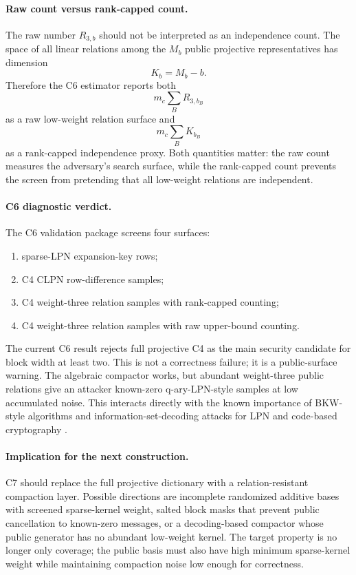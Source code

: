 \paragraph{Raw count versus rank-capped count.}
The raw number $R_{3,b}$ should not be interpreted as an independence count.
The space of all linear relations among the $M_b$ public projective
representatives has dimension
\[
    K_b = M_b-b.
\]
Therefore the C6 estimator reports both
\[
    m_c \sum_B R_{3,b_B}
\]
as a raw low-weight relation surface and
\[
    m_c \sum_B K_{b_B}
\]
as a rank-capped independence proxy.  Both quantities matter: the raw count
measures the adversary's search surface, while the rank-capped count prevents
the screen from pretending that all low-weight relations are independent.

\paragraph{C6 diagnostic verdict.}
The C6 validation package screens four surfaces:
\begin{enumerate}
    \item sparse-LPN expansion-key rows;
    \item C4 CLPN row-difference samples;
    \item C4 weight-three relation samples with rank-capped counting;
    \item C4 weight-three relation samples with raw upper-bound counting.
\end{enumerate}
The current C6 result rejects full projective C4 as the main security
candidate for block width at least two.  This is not a correctness failure;
it is a public-surface warning.  The algebraic compactor works, but abundant
weight-three public relations give an attacker known-zero q-ary-LPN-style
samples at low accumulated noise.  This interacts directly with the known
importance of BKW-style algorithms and information-set-decoding attacks for
LPN and code-based cryptography \cite{BlumKalaiWasserman2003,BogosEtAl2015,Prange1962,Stern1989,MayMeurerThomae2011,BeckerJouxMayMeurer2012}.

\paragraph{Implication for the next construction.}
C7 should replace the full projective dictionary with a relation-resistant
compaction layer.  Possible directions are incomplete randomized additive
bases with screened sparse-kernel weight, salted block masks that prevent
public cancellation to known-zero messages, or a decoding-based compactor
whose public generator has no abundant low-weight kernel.  The target
property is no longer only coverage; the public basis must also have high
minimum sparse-kernel weight while maintaining compaction noise low enough for
correctness.
